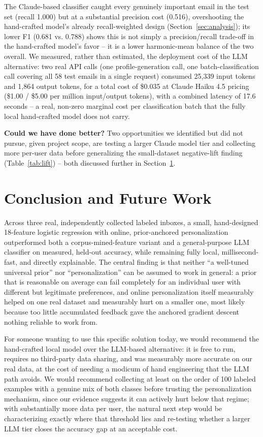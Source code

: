 \documentclass[twoside,twocolumn,10pt]{article}
\begin{document}
The Claude-based classifier caught every genuinely important email in the test set (recall 1.000) but at a substantial precision cost (0.516), overshooting the hand-crafted model's already recall-weighted design (Section~\ref{sec:analysis}); its lower F1 (0.681 vs. 0.788) shows this is not simply a precision/recall trade-off in the hand-crafted model's favor -- it is a lower harmonic-mean balance of the two overall. We measured, rather than estimated, the deployment cost of the LLM alternative: two real API calls (one profile-generation call, one batch-classification call covering all 58 test emails in a single request) consumed 25{,}339 input tokens and 1{,}864 output tokens, for a total cost of \$0.035 at Claude Haiku 4.5 pricing (\$1.00 / \$5.00 per million input/output tokens), with a combined latency of 17.6 seconds -- a real, non-zero marginal cost per classification batch that the fully local hand-crafted model does not carry.

\textbf{Could we have done better?} Two opportunities we identified but did not pursue, given project scope, are testing a larger Claude model tier and collecting more per-user data before generalizing the small-dataset negative-lift finding (Table~\ref{tab:lift}) -- both discussed further in Section~\ref{sec:conclusion}.

\section{Conclusion and Future Work}
\label{sec:conclusion}

Across three real, independently collected labeled inboxes, a small, hand-designed 18-feature logistic regression with online, prior-anchored personalization outperformed both a corpus-mined-feature variant and a general-purpose LLM classifier on measured, held-out accuracy, while remaining fully local, millisecond-fast, and directly explainable. The central finding is that neither ``a well-tuned universal prior'' nor ``personalization'' can be assumed to work in general: a prior that is reasonable on average can fail completely for an individual user with different but legitimate preferences, and online personalization itself measurably helped on one real dataset and measurably hurt on a smaller one, most likely because too little accumulated feedback gave the anchored gradient descent nothing reliable to work from.

For someone wanting to use this specific solution today, we would recommend the hand-crafted local model over the LLM-based alternative: it is free to run, requires no third-party data sharing, and was measurably more accurate on our real data, at the cost of needing a modicum of hand engineering that the LLM path avoids. We would recommend collecting at least on the order of 100 labeled examples with a genuine mix of both classes before trusting the personalization mechanism, since our evidence suggests it can actively hurt below that regime; with substantially more data per user, the natural next step would be characterizing exactly where that threshold lies and re-testing whether a larger LLM tier closes the accuracy gap at an acceptable cost.
\end{document}
